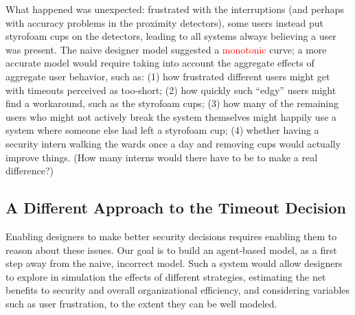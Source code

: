 \documentclass{acm_proc_article-sp}
\newcommand{\ignore}[1] {}
\begin{document}
What happened was unexpected:
frustrated with the interruptions (and perhaps with accuracy problems
in the proximity detectors), some users instead put styrofoam cups on the 
detectors, leading to all systems always believing a user was present.
The naive designer model suggested a \textcolor{red}{monotonic} \ignore{linear} curve; a more accurate model
would require taking into account the aggregate effects of aggregate user  behavior, such as: (1) how frustrated different users might get with timeouts perceived as too-short; (2) how quickly such ``edgy'' users might find a workaround, such as the styrofoam cups; (3) how many of the remaining users who might not actively break the system themselves might happily use a system where someone else had left a styrofoam cup; (4) whether having a security intern walking the wards once a day and removing cups would actually improve things.  (How many interns would there have to be to make a real difference?)

\subsection{A Different Approach to the Timeout Decision}

Enabling designers to make better security decisions requires enabling
them to reason about these issues.  Our goal is to build an
agent-based model, as a first step away from the naive, incorrect
model. Such a system would allow designers to explore in simulation
the effects of different strategies, estimating the net benefits to
security and overall organizational efficiency, and considering
variables such as user frustration, to the extent they can be well
modeled.

\ignore{\subsection{An Alternative To The Standard Approach}}
\end{document}
